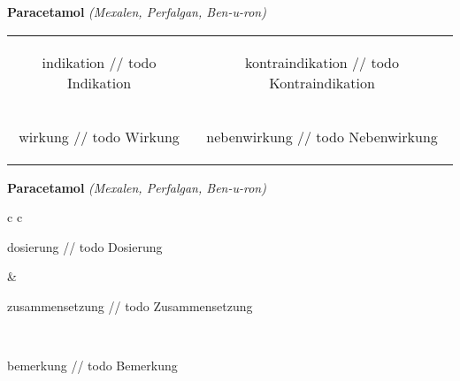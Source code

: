 \documentclass[12pt]{beamer}
\begin{document}
\begin{frame}{
    \textbf{Paracetamol}
    \textit{(Mexalen, Perfalgan, Ben-u-ron)}
}
    \begin{tabular}{c c}
        \begin{beamercolorbox}[wd=\boxwidth\textwidth,ht=\boxheight\textheight,sep=1em]{indikation}
        // todo Indikation
        \end{beamercolorbox} & 
        \begin{beamercolorbox}[wd=\boxwidth\textwidth,ht=\boxheight\textheight,sep=1em]{kontraindikation}
        // todo Kontraindikation 
        \end{beamercolorbox} \\
        \begin{beamercolorbox}[wd=\boxwidth\textwidth,ht=\boxheight\textheight,sep=1em]{wirkung}
        // todo Wirkung
        \end{beamercolorbox} & 
        \begin{beamercolorbox}[wd=\boxwidth\textwidth,ht=\boxheight\textheight,sep=1em]{nebenwirkung}
        // todo Nebenwirkung
        \end{beamercolorbox} \\
    \end{tabular}
\end{frame}

\begin{frame}{
    \textbf{Paracetamol}
    \textit{(Mexalen, Perfalgan, Ben-u-ron)}
}
    \begin{tabular}{c c}
        \begin{beamercolorbox}[wd=\boxwidth\textwidth,ht=\boxheight\textheight,sep=1em]{dosierung}
        // todo Dosierung
        \end{beamercolorbox} & 
        \begin{beamercolorbox}[wd=\boxwidth\textwidth,ht=\boxheight\textheight,sep=1em]{zusammensetzung}
        // todo Zusammensetzung
        \end{beamercolorbox} \\
        \begin{beamercolorbox}[wd=\textwidth,ht=\boxheight\textheight,sep=1em]{bemerkung}
        // todo Bemerkung
        \end{beamercolorbox} \\
    \end{tabular}
\end{frame}
\end{document}
